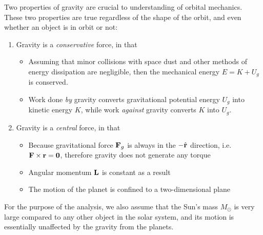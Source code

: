 \documentclass[11pt]{article}
\newcommand{\mb}[1]{
  \ensuremath\mathbf{#1}
}
\begin{document}
Two properties of gravity are crucial to understanding of orbital mechanics.
These two properties are true regardless of the shape of the orbit, and even
whether an object is in orbit or not:
\begin{enumerate}[leftmargin=18pt]
\item Gravity is a \emph{conservative} force, in that
  \begin{itemize}[leftmargin=15pt]
  \item Assuming that minor collisions with space dust and other methods of
    energy dissipation are negligible, then the mechanical energy
    $E=K+U_g$ is conserved.
  \item Work done \emph{by} gravity converts gravitational potential energy
    $U_g$ into kinetic energy $K$, while work \emph{against} gravity converts
    $K$ into $U_g$.
  \end{itemize}
\item Gravity is a \emph{central} force, in that
  \begin{itemize}[leftmargin=15pt]
  \item Because gravitational force $\mb{F}_g$ is always in the $-\hat{\mb{r}}$
    direction, i.e.\ $\mb{F}\times\mb{r}=\mb{0}$,  therefore gravity does not
    generate any torque
  \item Angular momentum $\mb{L}$ is constant as a result
  \item The motion of the planet is confined to a two-dimensional plane
  \end{itemize}
\end{enumerate}
For the purpose of the analysis, we also assume that the Sun's mass $M_\odot$
is very large compared to any other object in the solar system, and  its motion
is essentially unaffected by the gravity from the planets.
\end{document}
